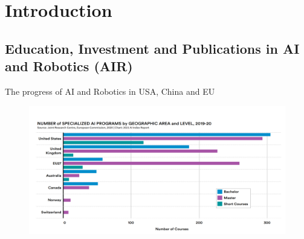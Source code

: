\section{Introduction}

\subsection{Education, Investment and Publications in AI and Robotics (AIR)}

{

\begin{frame}{The progress of AI and Robotics in USA, China and EU}

\begin{figure}
 \centering
 \includegraphics[width=1.0\textwidth]{./figures/progress-of-air/versions/drawing-v00.png}
\end{figure}

\end{frame}
}


